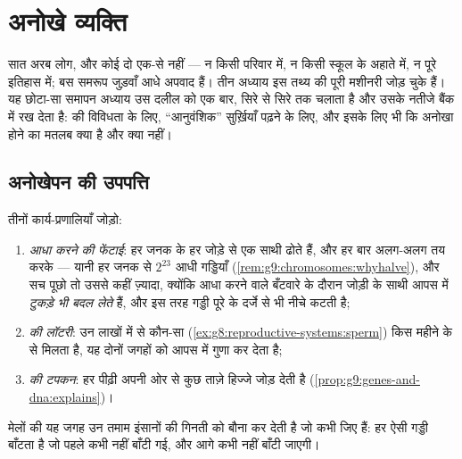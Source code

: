 \chapter{अनोखे व्यक्ति}\label{ch:g9:unique-individuals}

सात अरब लोग, और कोई दो एक-से नहीं --- न किसी परिवार में, न किसी स्कूल के
अहाते में, न पूरे इतिहास में; बस समरूप जुड़वाँ आधे अपवाद हैं। तीन अध्याय
इस तथ्य की पूरी मशीनरी जोड़ चुके हैं। यह छोटा-सा समापन अध्याय उस दलील को
एक बार, सिरे से सिरे तक चलाता है और उसके नतीजे बैंक में रख देता है:
 की विविधता के लिए, ``आनुवंशिक'' सुर्ख़ियाँ पढ़ने के लिए, और इसके
लिए भी कि अनोखा होने का मतलब क्या है और क्या नहीं।

\section{अनोखेपन की उपपत्ति}

\begin{proposition}[कोई दो लोग एक-से क्यों नहीं होते]\label{prop:g9:unique-individuals:theorem}
तीनों कार्य-प्रणालियाँ जोड़ो:
\begin{enumerate}
  \item \emph{आधा करने की फेंटाई}: हर जनक के  हर जोड़े से एक
        साथी ढोते हैं, और हर बार अलग-अलग तय करके --- यानी हर जनक से
        $2^{23}$ आधी गड्डियाँ
        (\cref{rem:g9:chromosomes:whyhalve}), और सच पूछो तो उससे कहीं
        ज़्यादा, क्योंकि आधा करने वाले बँटवारे के दौरान जोड़ी के साथी
        आपस में \emph{टुकड़े भी बदल लेते} हैं, और इस तरह गड्डी पूरे
         के दर्जे से भी नीचे कटती है;
  \item \emph{ की लॉटरी}: उन लाखों में से कौन-सा 
        (\cref{ex:g8:reproductive-systems:sperm}) किस महीने के  से
        मिलता है, यह दोनों जगहों को आपस में गुणा कर देता है;
  \item \emph{ की टपकन}: हर पीढ़ी अपनी ओर से कुछ ताज़े
        हिज्जे जोड़ देती है
        (\cref{prop:g9:genes-and-dna:explains})।
\end{enumerate}
मेलों की यह जगह उन तमाम इंसानों की गिनती को बौना कर देती है जो कभी जिए
हैं: हर  ऐसी गड्डी बाँटता है जो पहले कभी नहीं बाँटी गई, और आगे कभी
नहीं बाँटी जाएगी।
\end{proposition}
\admitted

